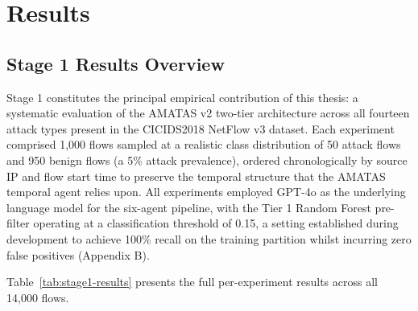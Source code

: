 \chapter{Results}
\label{ch:results}

\section{Stage 1 Results Overview}
\label{sec:results-overview}

Stage 1 constitutes the principal empirical contribution of this thesis: a systematic evaluation of the AMATAS v2 two-tier architecture across all fourteen attack types present in the CICIDS2018 NetFlow v3 dataset. Each experiment comprised 1,000 flows sampled at a realistic class distribution of 50 attack flows and 950 benign flows (a 5\% attack prevalence), ordered chronologically by source IP and flow start time to preserve the temporal structure that the AMATAS temporal agent relies upon. All experiments employed GPT-4o as the underlying language model for the six-agent pipeline, with the Tier 1 Random Forest pre-filter operating at a classification threshold of 0.15, a setting established during development to achieve 100\% recall on the training partition whilst incurring zero false positives (Appendix B).

Table~\ref{tab:stage1-results} presents the full per-experiment results across all 14,000 flows.

